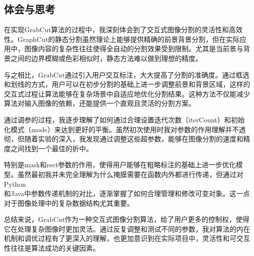 \documentclass[UTF8]{ctexart}
\begin{document}
\subsection{体会与思考}
在实现GrabCut算法的过程中，我深刻体会到了交互式图像分割的灵活性和高效性。GraphCut的静态分割虽然理论上能够提供精确的前景背景分割，但在实际应用中，图像内容的复杂性往往使得全自动的分割效果受到限制。尤其是当前景与背景之间的边界模糊或色彩相似时，静态方法难以做到理想的精度。\par
与之相比，GrabCut通过引入用户交互标注，大大提高了分割的准确度。通过框选和划线的方式，用户可以在初步分割的基础上进一步调整前景和背景区域，这样的交互式过程让算法能够在复杂场景中自适应地优化分割结果。这种方法不仅能减少算法对输入图像的依赖，还能提供一个直观且灵活的分割方案。\par
通过调参的过程，我逐步理解了如何通过合理设置迭代次数（iterCount）和初始化模式（mode）来达到更好的平衡。虽然初次使用时我对参数的作用理解并不透彻，但随着实验的深入，我发现通过调整这些超参数，能够在图像分割的速度和精度之间找到一个最佳的折中。\par
特别是mask和rect参数的作用，使得用户能够在粗略标注的基础上进一步优化模型。虽然最初我并未完全理解为什么掩膜需要在函数内外都进行传递，但通过对Python\\和Java中参数传递机制的对比，逐渐掌握了如何合理管理和修改可变对象。这一点对于图像处理中的复杂数据结构尤其重要。\par
总结来说，GrabCut作为一种交互式图像分割算法，给了用户更多的控制权，使得它在处理复杂图像时更加灵活。通过反复调整和测试不同的参数，我对算法的内在机制和调优过程有了更深入的理解，也更加意识到在实际项目中，灵活性和可交互性往往是算法成功的关键因素。
\end{document}

